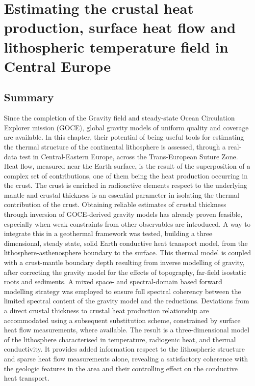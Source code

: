 \chapter[
	tocentry={Crustal heat production, heat flow and temperature in Central Europe},
	head={Crustal RHP, heat flow and temperature field in Central Europe}]{Estimating the crustal heat production, surface heat flow and lithospheric temperature field in Central Europe}
\label{c:ThermAppl}

\section*{Summary}
\label{s:Appl:Summary}
Since the completion of the Gravity field and steady-state Ocean Circulation Explorer mission (GOCE), global gravity models of uniform quality and coverage are available.
In this chapter, their potential of being useful tools for estimating the thermal structure of the continental lithosphere is assessed, through a real-data test in Central-Eastern Europe, across the Trans-European Suture Zone.
Heat flow, measured near the Earth surface, is the result of the superposition of a complex set of contributions, one of them being the heat production occurring in the crust.
The crust is enriched in radioactive elements respect to the underlying mantle and crustal thickness is an essential parameter in isolating the thermal contribution of the crust.
Obtaining reliable estimates of crustal thickness through inversion of GOCE-derived gravity models has already proven feasible, especially when weak constraints from other observables are introduced.
A way to integrate this in a geothermal framework was tested, building a three dimensional, steady state, solid Earth conductive heat transport model, from the lithosphere-asthenosphere boundary to the surface.
This thermal model is coupled with a crust-mantle boundary depth resulting from inverse modelling of gravity, after correcting the gravity model for the effects of topography, far-field isostatic roots and sediments.
A mixed space- and spectral-domain based forward modelling strategy was employed to ensure full spectral coherency between the limited spectral content of the gravity model and the reductions.
Deviations from a direct crustal thickness to crustal heat production relationship are accommodated using a subsequent substitution scheme, constrained by surface heat flow measurements, where available.
The result is a three-dimensional model of the lithosphere characterised in temperature, radiogenic heat, and thermal conductivity.
It provides added information respect to the lithospheric structure and sparse heat flow measurements alone, revealing a satisfactory coherence with the geologic features in the area and their controlling effect on the conductive heat transport.

